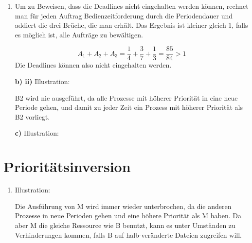 \documentclass[a4paper,11pt,ngerman]{scrartcl}
\begin{document}
\begin{enumerate}[\bf a)]
    \item Um zu Beweisen, dass die Deadlines nicht eingehalten werden können, rechnet man für jeden Auftrag Bedienzeitforderung durch die Periodendauer und addiert die drei Brüche, die man erhält. Das Ergebnis ist kleiner-gleich 1, falls es möglich ist, alle Aufträge zu bewältigen.
        
    \begin{displaymath}
        A_1 + A_2 + A_3 = \frac{1}{4} + \frac{3}{7} + \frac{1}{3} = \frac{85}{84} > 1
    \end{displaymath}
    Die Deadlines können also nicht eingehalten werden. 
    
    \item[\textbf{b) ii)}] Illustration:
    \begin{center}
        \scalebox{0.4}{}
    \end{center}
    B2 wird nie ausgeführt, da alle Prozesse mit höherer Priorität in eine neue Periode gehen, und damit zu jeder Zeit ein Prozess mit höherer Priorität als B2 vorliegt.
    
    \item[\bf c)] Illustration:
    \begin{center}
        \scalebox{0.65}{}
    \end{center}
    
\end{enumerate}

\section{Prioritätsinversion}

\begin{enumerate}[\bf a)]
    \item Illustration:
    \begin{center}
        \scalebox{0.4}{}
    \end{center}
    
    Die Ausführung von M wird immer wieder unterbrochen, da die anderen Prozesse in neue Perioden gehen und eine höhere Priorität als M haben. Da aber M die gleiche Ressource wie B benutzt, kann es unter Umständen zu Verhinderungen kommen, falls B auf halb-veränderte Dateien zugreifen will.
     
\end{enumerate}
\end{document}

